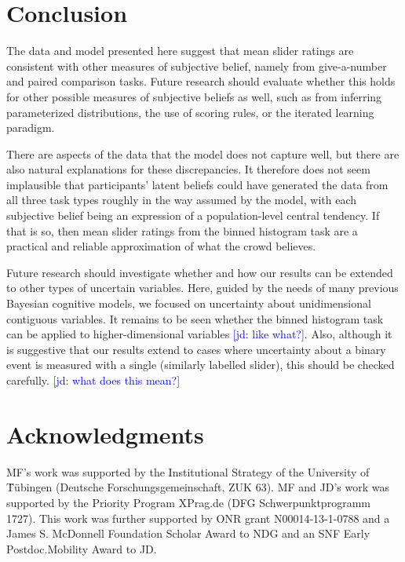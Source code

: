 \documentclass[10pt,letterpaper]{article}
\newcommand{\jd}[1]{\textcolor{Blue}{[jd: #1]}}
\begin{document}
\section{Conclusion}

The data and model presented here suggest that mean slider ratings are consistent with other
measures of subjective belief, namely from give-a-number and paired comparison tasks. Future
research should evaluate whether this holds for other possible measures of subjective beliefs
as well, such as from inferring parameterized distributions, the use of scoring rules, or the
iterated learning paradigm. 

There are aspects of the data that the model does not capture well, but there are also natural
explanations for these discrepancies. It therefore does not seem implausible that participants'
latent beliefs could have generated the data from all three task types roughly in the way assumed by the model, with each subjective belief being an expression of a population-level
central tendency. If that is so, then mean slider ratings from the binned histogram task are a practical and reliable approximation of what the crowd believes.


Future research should investigate whether and how our results can be extended to other types of
uncertain variables. Here, guided by the needs of many previous Bayesian cognitive models, we focused on uncertainty about unidimensional contiguous variables. It
remains to be seen whether the binned histogram task can be applied to higher-dimensional
variables \jd{like what?}. Also, although it is suggestive that our results extend to cases where uncertainty
about a binary event is measured with a single (similarly labelled slider), this should be
checked carefully. \jd{what does this mean?}

\section{Acknowledgments}

MF's work was supported by the Institutional Strategy of the University of T̈\"{u}bingen (Deutsche
Forschungsgemeinschaft, ZUK 63). MF and JD's work was supported by the Priority Program XPrag.de (DFG Schwerpunktprogramm
1727). This work was further supported by ONR grant N00014-13-1-0788 and a James S. McDonnell Foundation Scholar Award to NDG and an SNF Early Postdoc.Mobility Award to JD.





\setlength{\bibleftmargin}{.125in}
\setlength{\bibindent}{-\bibleftmargin}


\end{document}
